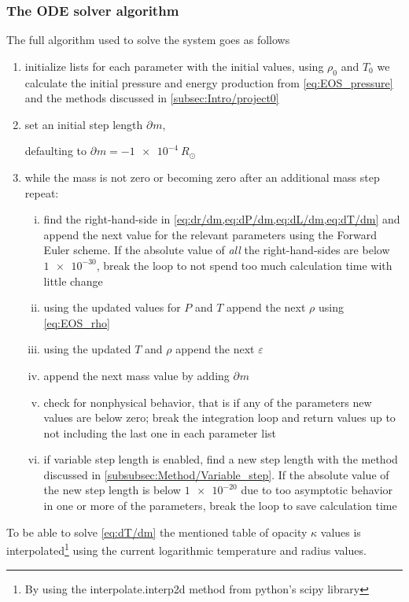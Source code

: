 \documentclass[11pt,a4paper,twocolumn,titlepage]{article}
\begin{document}
\subsubsection{The ODE solver algorithm} \label{subsubsec:Method/Algorithm}
The full algorithm used to solve the system goes as follows
\begin{enumerate}
\item initialize lists for each parameter with the initial values, using $\rho_0$ and $T_0$ we calculate the initial pressure and energy production from \cref{eq:EOS_pressure} and the methods discussed in \cref{subsec:Intro/project0}

\item set an initial step length $\partial^{}m$,

defaulting to ${\partial^{}m = \SI{-1e-4}{R_\odot}}$

\item while the mass is not zero or becoming zero after an additional mass step repeat:
\begin{enumerate}[i.]
\item find the right-hand-side in \cref{eq:dr/dm,eq:dP/dm,eq:dL/dm,eq:dT/dm} and append the next value for the relevant parameters using the Forward Euler scheme. If the absolute value of \textit{all} the right-hand-sides are below $\num{1e-30}$, break the loop to not spend too much calculation time with little change

\item using the updated values for $P$ and $T$ append the next $\rho$ using \cref{eq:EOS_rho}

\item using the updated $T$ and $\rho$ append the next $\varepsilon$

\item append the next mass value by adding $\partial^{} m$

\item check for nonphysical behavior, that is if any of the parameters new values are below zero; break the integration loop and return values up to not including the last one in each parameter list

\item if variable step length is enabled, find a new step length with the method discussed in \cref{subsubsec:Method/Variable_step}. If the absolute value of the new step length is below $\num{1e-20}$ due to too asymptotic behavior in one or more of the parameters, break the loop to save calculation time
\end{enumerate}
\end{enumerate}
To be able to solve \cref{eq:dT/dm} the mentioned table of opacity $\kappa$ values is interpolated\footnote{By using the interpolate.interp2d method from python's scipy library} using the current logarithmic temperature 
and radius values.
\end{document}
